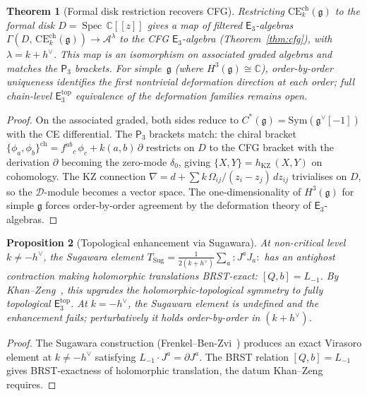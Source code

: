 \documentclass[11pt,reqno]{amsart}
\newtheorem{theorem}{Theorem}[section]
\newtheorem{proposition}[theorem]{Proposition}
\theoremstyle{definition}
\theoremstyle{remark}
\newcommand{\cA}{\mathcal{A}}
\newcommand{\cD}{\mathcal{D}}
\newcommand{\CE}{\mathrm{CE}}
\providecommand{\Ethree}{\mathsf{E}_{3}}
\newcommand{\Pthree}{\mathsf{P}_{3}}
\newcommand{\Sym}{\mathrm{Sym}}
\DeclareMathOperator{\Spec}{Spec}
\newcommand{\fg}{\mathfrak{g}}
\newcommand{\CC}{\mathbb{C}}
\numberwithin{equation}{section}
\begin{document}
\begin{theorem}[Formal disk restriction recovers CFG]
\label{thm:chiral-e3-cfg}
\label{thm:chiral-e3-structure}
Restricting $\CE^{\mathrm{ch}}_k(\fg)$ to the formal disk
$D = \Spec\,\CC[[z]]$ gives a map of filtered
$\Ethree$-algebras
$\Gamma(D,\, \CE^{\mathrm{ch}}_k(\fg))
\to \cA^\lambda$
to the CFG $\Ethree$-algebra
\textup{(}Theorem~\textup{\ref{thm:cfg}}\textup{)},
with $\lambda = k + h^\vee$.
This map is an isomorphism on associated graded
algebras and matches the $\Pthree$ brackets.
For simple~$\fg$ \textup{(}where
$H^3(\fg) \cong \CC$\textup{)}, order-by-order uniqueness
identifies the first nontrivial deformation direction at
each order; full chain-level $\Ethree^{\mathrm{top}}$
equivalence of the deformation families remains open.
\end{theorem}

\begin{proof}
On the associated graded, both sides reduce to
$C^*(\fg) = \Sym(\fg^\vee[-1])$ with the CE differential.
The $\Pthree$ brackets match: the chiral bracket
$\{\phi_a, \phi_b\}^{\mathrm{ch}}
= f^{ab}{}_c\,\phi_c + k(a,b)\,\partial$
restricts on $D$ to the CFG bracket with the derivation
$\partial$ becoming the zero-mode $\delta_0$, giving
$\{X, Y\} = h_{\mathrm{KZ}}\,(X,Y)$ on cohomology.
The KZ connection
$\nabla = d + \sum k\,\Omega_{ij}/(z_i{-}z_j)\,dz_{ij}$
trivialises on $D$, so the $\cD$-module becomes a vector
space. The one-dimensionality of $H^3(\fg)$ for simple
$\fg$ forces order-by-order agreement by the deformation
theory of $\Ethree$-algebras.
\end{proof}

\begin{proposition}[Topological enhancement via Sugawara]
\label{prop:khan-zeng-topological}
At non-critical level $k \neq -h^\vee$, the Sugawara element
$T_{\mathrm{Sug}} = \frac{1}{2(k + h^\vee)}
\sum_{a} {:} J^a J_a {:}$
has an antighost contraction making holomorphic translations BRST-exact:
$[Q, b] = L_{-1}$. By Khan--Zeng~\cite{KhanZeng25},
this upgrades the holomorphic-topological symmetry to
fully topological $\Ethree^{\mathrm{top}}$.
At $k = -h^\vee$, the Sugawara element is undefined and
the enhancement fails; perturbatively it holds
order-by-order in $(k + h^\vee)$.
\end{proposition}

\begin{proof}
The Sugawara construction (Frenkel--Ben-Zvi~\cite{FBZ04})
produces an exact Virasoro element at $k \neq -h^\vee$
satisfying $L_{-1} \cdot J^a = \partial J^a$.
The BRST relation $[Q,b] = L_{-1}$ gives BRST-exactness
of holomorphic translation, the datum
Khan--Zeng~\cite{KhanZeng25} requires.
\end{proof}
\end{document}

